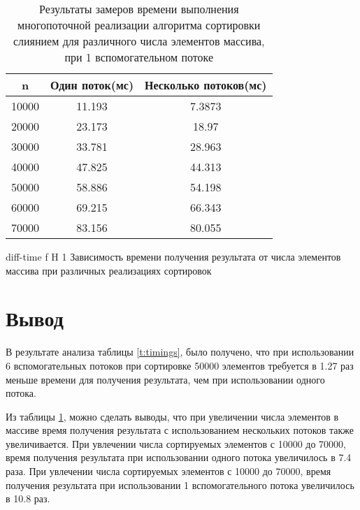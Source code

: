 \begin{table}[H]
	\centering
	\caption{Результаты замеров времени выполнения многопоточной реализации алгоритма сортировки слиянием для различного числа элементов массива, при 1 вспомогательном потоке}
	\begin{tabular}{|c|c|c|}
		\hline
		n       & Один поток(мс) & Несколько потоков(мс) \\ \hline
		10000 & 11.193                  & 7.3873                            \\ \hline
		20000 & 23.173                  & 18.97                             \\ \hline
		30000 & 33.781                  & 28.963                            \\ \hline
		40000 & 47.825                  & 44.313                            \\ \hline
		50000 & 58.886                  & 54.198                            \\ \hline
		60000 & 69.215                  & 66.343                            \\ \hline
		70000 & 83.156                  & 80.055                            \\ \hline
	\end{tabular}
	\label{t:timings-n}
\end{table}


\newpage

{diff-time} %
{f} %
{H} %
{1\textwidth} %
{Зависимость времени получения результата от числа элементов массива при различных реализациях сортировок} %


\section*{Вывод}
В результате анализа таблицы \ref{t:timings}, было получено, что при использовании 6 вспомогательных потоков при сортировке 50000 элементов требуется в 1.27 раз меньше времени для получения результата, чем при использовании одного потока. 

Из таблицы \ref{t:timings-n}, можно сделать выводы, что при увеличении числа элементов в массиве
время получения результата с использованием нескольких потоков также увеличивается. При увлечении числа сортируемых элементов с 10000 до 70000, время получения результата при использовании одного потока  увеличилось в 7.4 раза.
При увлечении числа сортируемых элементов с 10000 до 70000, время получения результата при использовании 1 вспомогательного потока увеличилось в 10.8 раз.


